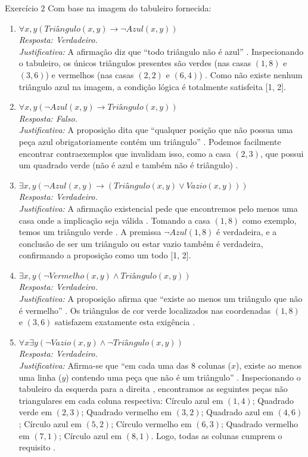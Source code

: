 \documentclass[a4paper,11pt]{article}
\theoremstyle{definition}
\theoremstyle{plain}
\theoremstyle{remark}
\newcounter{questao}[section]
\begin{document}
\newpage \begin{questaoManually}{Exercício 2}
Com base na imagem do tabuleiro fornecida:

\begin{enumerate}
\item \textbf{$\forall x, y (Triângulo(x, y) \to \neg Azul(x, y))$} \\
\textit{Resposta: Verdadeiro.} \\
\textit{Justificativa:} A afirmação diz que ``todo triângulo não é azul'' . Inspecionando o tabuleiro, os únicos triângulos presentes são verdes (nas casas $(1, 8)$ e $(3, 6)$) e vermelhos (nas casas $(2, 2)$ e $(6, 4)$) . Como não existe nenhum triângulo azul na imagem, a condição lógica é totalmente satisfeita [1, 2].

\item \textbf{$\forall x, y (\neg Azul(x, y) \to Triângulo(x, y))$} \\
\textit{Resposta: Falso.} \\
\textit{Justificativa:} A proposição dita que ``qualquer posição que não possua uma peça azul obrigatoriamente contém um triângulo'' . Podemos facilmente encontrar contraexemplos que invalidam isso, como a casa $(2, 3)$, que possui um quadrado verde (não é azul e também não é triângulo) . 

\item \textbf{$\exists x, y (\neg Azul(x, y) \to (Triângulo(x, y) \lor Vazio(x, y)))$} \\
\textit{Resposta: Verdadeiro.} \\
\textit{Justificativa:} A afirmação existencial pede que encontremos pelo menos uma casa onde a implicação seja válida . Tomando a casa $(1, 8)$ como exemplo, temos um triângulo verde . A premissa $\neg Azul(1, 8)$ é verdadeira, e a conclusão de ser um triângulo ou estar vazio também é verdadeira, confirmando a proposição como um todo [1, 2].

\item \textbf{$\exists x, y (\neg Vermelho(x, y) \land Triângulo(x, y))$} \\
\textit{Resposta: Verdadeiro.} \\
\textit{Justificativa:} A proposição afirma que ``existe ao menos um triângulo que não é vermelho'' . Os triângulos de cor verde localizados nas coordenadas $(1, 8)$ e $(3, 6)$ satisfazem exatamente esta exigência .

\item \textbf{$\forall x \exists y (\neg Vazio(x, y) \land \neg Triângulo(x, y))$} \\
\textit{Resposta: Verdadeiro.} \\
\textit{Justificativa:} Afirma-se que ``em cada uma das 8 colunas ($x$), existe ao menos uma linha ($y$) contendo uma peça que não é um triângulo'' . Inspecionando o tabuleiro da esquerda para a direita , encontramos as seguintes peças não triangulares em cada coluna respectiva:
Círculo azul em $(1, 4)$; Quadrado verde em $(2, 3)$; Quadrado vermelho em $(3, 2)$; Quadrado azul em $(4, 6)$; Círculo azul em $(5, 2)$; Círculo vermelho em $(6, 3)$; Quadrado vermelho em $(7, 1)$; Círculo azul em $(8, 1)$. Logo, todas as colunas cumprem o requisito .


\end{enumerate}
\end{questaoManually}
\end{document}
